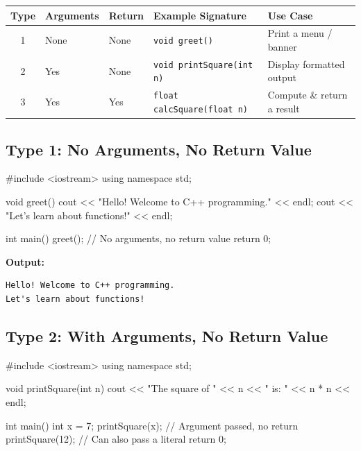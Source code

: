 \begin{center}
\renewcommand{\arraystretch}{1.4}
\footnotesize
\begin{tabular}{@{}cllp{3cm}p{3.2cm}@{}}
\toprule
\textbf{Type} & \textbf{Arguments} & \textbf{Return}
    & \textbf{Example Signature}
    & \textbf{Use Case} \\
\midrule
1 & None & None
    & \texttt{void greet()}
    & Print a menu / banner \\
2 & Yes  & None
    & \texttt{void printSquare(int n)}
    & Display formatted output \\
3 & Yes  & Yes
    & \texttt{float calcSquare(float n)}
    & Compute \& return a result \\
\bottomrule
\end{tabular}
\end{center}

\subsection{Type 1: No Arguments, No Return Value}

\begin{cppcode}
#include <iostream>
using namespace std;

void greet()
{
    cout << "Hello! Welcome to C++ programming."
         << endl;
    cout << "Let's learn about functions!" << endl;
}

int main()
{
    greet();   // No arguments, no return value
    return 0;
}
\end{cppcode}

\noindent\textbf{Output:}
\begin{verbatim}
Hello! Welcome to C++ programming.
Let's learn about functions!
\end{verbatim}

\subsection{Type 2: With Arguments, No Return Value}

\begin{cppcode}
#include <iostream>
using namespace std;

void printSquare(int n)
{
    cout << "The square of " << n
         << " is: " << n * n << endl;
}

int main()
{
    int x = 7;
    printSquare(x);   // Argument passed, no return
    printSquare(12);  // Can also pass a literal
    return 0;
}
\end{cppcode}

